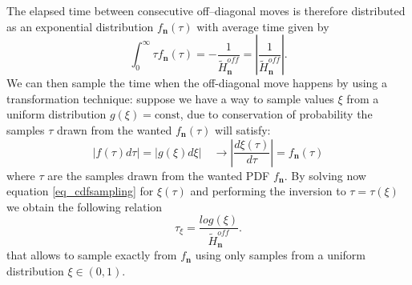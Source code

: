 The elapsed time between consecutive off--diagonal moves is therefore distributed as an exponential 
distribution $f_{\mathbf{n}}(\tau)$ with average time given by
\begin{equation}
\int_{0}^{\infty} \tau f_{\mathbf{n}}(\tau) = -\frac{1}{\widetilde{H}^{off}_{\mathbf{n}}} = \left\vert \frac{1}{\widetilde{H}^{off}_{\mathbf{n}}}\right\vert .
\end{equation}
We can then sample the time when the off-diagonal move happens by using a transformation technique: suppose we have a way to sample values $\xi$ from a uniform distribution 
$g(\xi) = \text{const}$, due to conservation of probability the samples $\tau$ drawn from the wanted $f_{\mathbf{n}}(\tau)$ will satisfy:
\begin{equation}
\label{eq_cdfsampling}
\vert f(\tau) d\tau \vert = \vert g(\xi) d\xi \vert \quad \longrightarrow \left\vert \frac{d \xi(\tau)}{d \tau} \right\vert = f_{\mathbf{n}}(\tau)
\end{equation}
where $\tau$ are the samples drawn from the wanted PDF $f_{\mathbf{n}}$. By solving now equation \eqref{eq_cdfsampling} for $\xi(\tau)$ and performing the inversion to
$\tau=\tau(\xi)$ we obtain the following relation
\begin{equation}
\label{sampled_tau}
\tau_{\xi}=\frac{log(\xi)}{\widetilde{H}^{off}_{\mathbf{n}}}.
\end{equation}
that allows to sample exactly from $f_{\mathbf{n}}$ using only samples from a uniform distribution $\xi \in (0,1)$.

